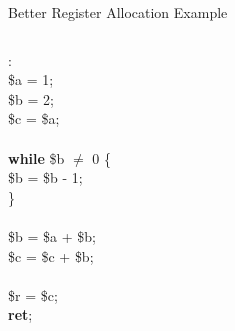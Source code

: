 \documentclass[aspectratio=169]{beamer}
\begin{document}
\begin{frame}{Better Register Allocation Example}
\begin{columns}
\begin{column}{3cm}
            \begin{algo}
                :\+
                \\ \$a = 1;
                \\ \$b = 2;
                \\ \$c = \$a;
                \\
                \\ \textbf{while} \$b $\ne$ 0 \{\+
                \\ \$b = \$b - 1;\-
                \\ \}
                \\
                \\ \textcolor{sigma@alertred}{\$b} = \$a + \$b;
                \\ \$c = \$c + \textcolor{sigma@alertred}{\$b};
                \\
                \\ \$r = \$c;
                \\ \textbf{ret};
            \end{algo}
        \end{column}
    \end{columns}
\end{frame}
\end{document}
